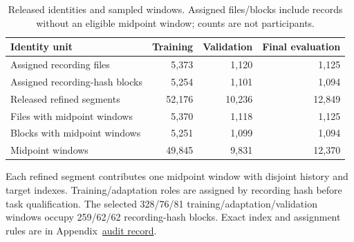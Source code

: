 \begin{table}[htbp]
\centering\small
\caption{Released identities and sampled windows. Assigned files/blocks include
records without an eligible midpoint window; counts are not participants.}
\label{tab:release-partition-identities}\hypertarget{tab:release-partition-identities}{}
\begin{tabular}{@{}p{.45\linewidth}rrr@{}}
\toprule
Identity unit & Training & Validation & Final evaluation\\
\midrule
Assigned recording files & 5,373 & 1,120 & 1,125\\
Assigned recording-hash blocks & 5,254 & 1,101 & 1,094\\
Released refined segments & 52,176 & 10,236 & 12,849\\
Files with midpoint windows & 5,370 & 1,118 & 1,125\\
Blocks with midpoint windows & 5,251 & 1,099 & 1,094\\
Midpoint windows & 49,845 & 9,831 & 12,370\\
\bottomrule
\end{tabular}
\end{table}

Each refined segment contributes one midpoint window with disjoint history
and target indexes. Training/adaptation roles are assigned by recording hash
before task qualification. The selected 328/76/81 training/adaptation/validation
windows occupy 259/62/62 recording-hash blocks. Exact index and assignment rules
are in Appendix~\href{audit-notes.pdf\#sec:source-reconciliation-details}{audit record}.

